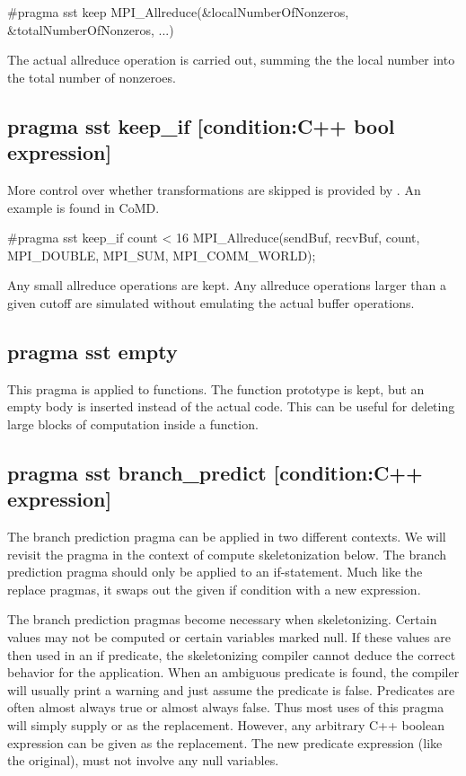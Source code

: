 \begin{CppCode}
#pragma sst keep
  MPI_Allreduce(&localNumberOfNonzeros, &totalNumberOfNonzeros, ...)
\end{CppCode}
The actual allreduce operation is carried out, summing the the local number into the total number of nonzeroes.

\subsection{pragma sst keep\_if [condition:C++ bool expression]}
More control over whether transformations are skipped is provided by .
An example is found in CoMD.

\begin{CppCode}
#pragma sst keep_if count < 16
   MPI_Allreduce(sendBuf, recvBuf, count, MPI_DOUBLE, MPI_SUM, MPI_COMM_WORLD);
\end{CppCode}
Any small allreduce operations are kept. 
Any allreduce operations larger than a given cutoff are simulated without emulating the actual buffer operations.

\subsection{pragma sst empty}
This pragma is applied to functions. The function prototype is kept, but an empty body is inserted instead of the actual code.
This can be useful for deleting large blocks of computation inside a function.

\subsection{pragma sst branch\_predict [condition:C++ expression]}
The branch prediction pragma can be applied in two different contexts.
We will revisit the pragma in the context of compute skeletonization below.
The branch prediction pragma should only be applied to an if-statement.
Much like the replace pragmas, it swaps out the given if condition with a new expression.

The branch prediction pragmas become necessary when skeletonizing.
Certain values may not be computed or certain variables marked null.
If these values are then used in an if predicate,
the skeletonizing compiler cannot deduce the correct behavior for the application.
When an ambiguous predicate is found, the compiler will usually print a warning and just assume the predicate is false.
Predicates are often almost always true or almost always false. 
Thus most uses of this pragma will simply supply  or  as the replacement.
However, any arbitrary C++ boolean expression can be given as the replacement.
The new predicate expression (like the original), must not involve any null variables.

